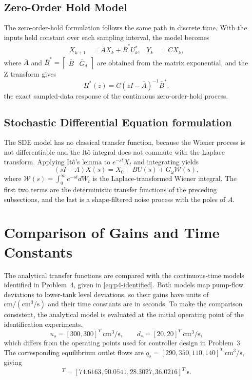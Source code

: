 \subsection{Zero-Order Hold Model}

The zero-order-hold formulation follows the same path in discrete time. With
the inputs held constant over each sampling interval, the model becomes
\begin{align}
    X_{k+1} &= \bar{A} X_k + \bar{B}^* U^*_k, & Y_k &= C X_k,
\end{align}
where $\bar{A}$ and $\bar{B}^* = \begin{bmatrix} \bar{B} & \bar{G}_d \end{bmatrix}$
are obtained from the matrix exponential, and the Z transform gives
\begin{equation}
    H^*(z) = C(zI - \bar{A})^{-1} \bar{B}^*,
\end{equation}
the exact sampled-data response of the continuous zero-order-hold process.

\subsection{Stochastic Differential Equation formulation}

The SDE model has no classical transfer function, because the Wiener process is
not differentiable and the It\^o integral does not commute with the Laplace
transform. Applying It\^o's lemma to $e^{-st}X_t$ and integrating yields
\begin{equation}
    (sI - A) X(s) = X_0 + B U(s) + G_\omega \mathcal{W}(s),
\end{equation}
where $\mathcal{W}(s) = \int_0^\infty e^{-st} dW_t$ is the Laplace-transformed
Wiener integral. The first two terms are the deterministic transfer functions of
the preceding subsections, and the last is a shape-filtered noise process with
the poles of $A$.

\section{Comparison of Gains and Time Constants}
\label{sec:p5-comparison}

The analytical transfer functions are compared with the continuous-time
models identified in Problem~4, given in \eqref{eq:p4-identified}.
Both models map pump-flow deviations to lower-tank level deviations, so
their gains have units of $\mathrm{cm/(cm^3/s)}$ and their time constants
are in seconds. To make the comparison consistent, the analytical model
is evaluated at the initial operating point of the identification
experiments,
\begin{equation}
 u_s=[300,300]^T\ \mathrm{cm^3/s},\qquad
 d_s=[20,20]^T\ \mathrm{cm^3/s},
\end{equation}
which differs from the operating points used for controller design in
Problem~3. The corresponding equilibrium outlet flows are
$q_s=[290,350,110,140]^T\ \mathrm{cm^3/s}$, giving
\begin{equation}
 [T_1,T_2,T_3,T_4]^T
 =[74.6163,90.0541,28.3027,36.0216]^T\ \mathrm{s}.
\end{equation}

